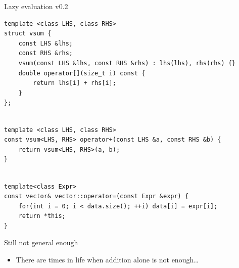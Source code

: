 \documentclass[@BEAMER_OPTIONS@]{beamer}
\begin{document}
\note{ }

\begin{frame}[fragile,shrink=2]{Lazy evaluation v0.2}
    \begin{exampleblock}{}
        \begin{lstlisting}
template <class LHS, class RHS>
struct vsum {
    const LHS &lhs;
    const RHS &rhs;
    vsum(const LHS &lhs, const RHS &rhs) : lhs(lhs), rhs(rhs) {}
    double operator[](size_t i) const {
        return lhs[i] + rhs[i];
    }
};
        \end{lstlisting}
        \pause
        \begin{lstlisting}[firstnumber=last]

template <class LHS, class RHS>
const vsum<LHS, RHS> operator+(const LHS &a, const RHS &b) {
    return vsum<LHS, RHS>(a, b);
}
        \end{lstlisting}
        \pause
        \begin{lstlisting}[firstnumber=last]

template<class Expr>
const vector& vector::operator=(const Expr &expr) {
    for(int i = 0; i < data.size(); ++i) data[i] = expr[i];
    return *this;
}
        \end{lstlisting}
    \end{exampleblock}
\end{frame}

\note{ }

\begin{frame}{Still not general enough}
    \begin{itemize}
        \item There are times in life when addition alone is not enough\ldots
    \end{itemize}
\end{frame}

\note{ }
\end{document}
